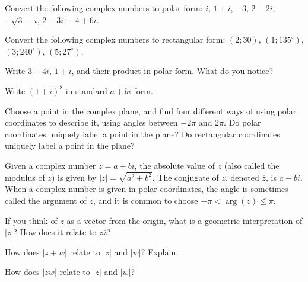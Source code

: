 \documentclass[space,nooutcomes]{ximera}
\begin{document}
\begin{problem}
Convert the following complex numbers to polar form: $i$, $1 + i$,  $-3$, $2 - 2i$, $-\sqrt{3}-i$, $2 - 3i$, $-4 + 6i$.  
\vfill 
\end{problem}

\begin{problem}
Convert the following complex numbers to rectangular form: $(2; 30)$, $(1; 135^\circ)$, 
$(3; 240^\circ)$, $(5; 27^\circ)$.  
\vfill 
\end{problem}

\newpage 

\begin{problem}
Write $3 + 4i$, $1 + i$, and their product in polar form.  What do you notice?  
\vfill 
\end{problem}

\begin{problem}
Write $(1 + i)^8$ in standard $a + bi$ form.  
\vfill 
\end{problem}

\begin{problem}
Choose a point in the complex plane, and find four different ways of using polar coordinates to describe it, using angles between $-2\pi$ and $2\pi$.  
Do polar coordinates uniquely label a point in the plane?
Do rectangular coordinates uniquely label a point in the plane?
\vfill 
\end{problem}

\newpage 


Given a complex number $z=a+bi$, the absolute value of $z$ (also called the modulus of $z$) is given by $|z|=\sqrt{a^2+b^2}$.  The conjugate of $z$, denoted $\overline{z}$, is $a-bi$.  When a complex number is given in polar coordinates, the angle is sometimes called the argument of $z$, and it is common to choose $-\pi<\arg(z)\le \pi$.  

\begin{problem}
If you think of $z$ as a vector from the origin, what is a geometric interpretation of $|z|$?  How does it relate to $z\overline{z}$?  
\vfill 
\end{problem}

\begin{problem}
How does $|z+w|$ relate to $|z|$ and $|w|$?  Explain.  
\vfill 
\end{problem}

\begin{problem}
How does $|zw|$ relate to $|z|$ and $|w|$?  
\vfill 
\end{problem}
\end{document}
